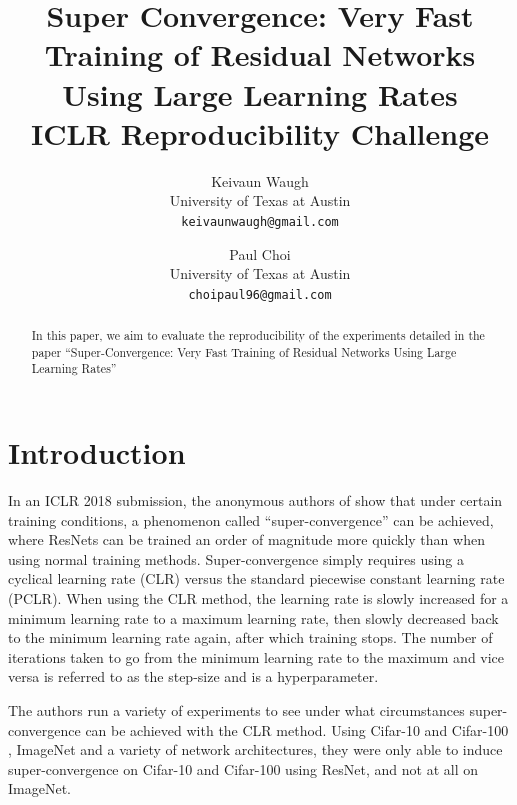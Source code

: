 \documentclass[10pt,twocolumn,letterpaper]{article}
\begin{document}
\title{
    Super Convergence: Very Fast Training of Residual Networks Using Large
    Learning Rates\\
    \large ICLR Reproducibility Challenge}

\author{Keivaun Waugh\\
University of Texas at Austin\\
{\tt\small keivaunwaugh@gmail.com}
\and
Paul Choi\\
University of Texas at Austin\\
{\tt\small choipaul96@gmail.com}
}

\maketitle

\begin{abstract}
In this paper, we aim to evaluate the reproducibility of the experiments
    detailed in the paper ``Super-Convergence: Very Fast Training of Residual
    Networks Using Large Learning Rates'' \cite{SuperConvergence}
\end{abstract}

\section{Introduction}
In an ICLR 2018 submission, the anonymous authors of \cite{SuperConvergence}
show that under certain training conditions, a phenomenon called
``super-convergence'' can be achieved, where ResNets \cite{ResNet} can be
trained an order of magnitude more quickly than when using normal training
methods.  Super-convergence simply requires using a cyclical learning rate
(CLR) versus the standard piecewise constant learning rate (PCLR). When using
the CLR method, the learning rate is slowly increased for a minimum learning
rate to a maximum learning rate, then slowly decreased back to the minimum
learning rate again, after which training stops. The number of iterations taken
to go from the minimum learning rate to the maximum and vice versa is referred
to as the step-size and is a hyperparameter.

The authors run a variety of experiments to see under what circumstances
super-convergence can be achieved with the CLR method. Using Cifar-10 and
Cifar-100 \cite{Cifar}, ImageNet \cite{ImageNet} and a variety of network
architectures, they were only able to induce super-convergence on Cifar-10 and
Cifar-100 using ResNet, and not at all on ImageNet.
\end{document}
